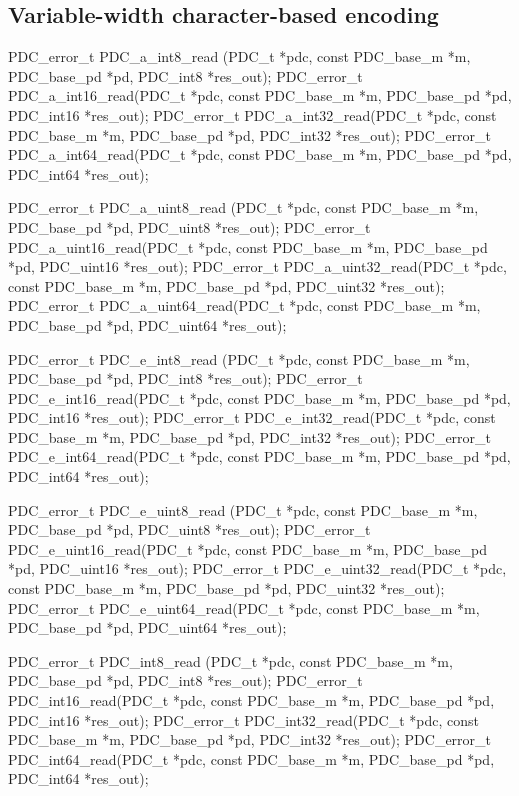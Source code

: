 \subsection{Variable-width character-based encoding}

\aedBegin{}
\aedEnd{}

\begin{tinycodeaux}{\leftmargin=0in}
\codeallowbreaks
PDC_error_t PDC_a_int8_read (PDC_t *pdc, const PDC_base_m *m,
			     PDC_base_pd *pd, PDC_int8 *res_out);
PDC_error_t PDC_a_int16_read(PDC_t *pdc, const PDC_base_m *m,
			     PDC_base_pd *pd, PDC_int16 *res_out);
PDC_error_t PDC_a_int32_read(PDC_t *pdc, const PDC_base_m *m,
			     PDC_base_pd *pd, PDC_int32 *res_out);
PDC_error_t PDC_a_int64_read(PDC_t *pdc, const PDC_base_m *m,
			     PDC_base_pd *pd, PDC_int64 *res_out);

PDC_error_t PDC_a_uint8_read (PDC_t *pdc, const PDC_base_m *m,
			      PDC_base_pd *pd, PDC_uint8 *res_out);
PDC_error_t PDC_a_uint16_read(PDC_t *pdc, const PDC_base_m *m,
			      PDC_base_pd *pd, PDC_uint16 *res_out);
PDC_error_t PDC_a_uint32_read(PDC_t *pdc, const PDC_base_m *m,
			      PDC_base_pd *pd, PDC_uint32 *res_out);
PDC_error_t PDC_a_uint64_read(PDC_t *pdc, const PDC_base_m *m,
			      PDC_base_pd *pd, PDC_uint64 *res_out);

PDC_error_t PDC_e_int8_read (PDC_t *pdc, const PDC_base_m *m,
			     PDC_base_pd *pd, PDC_int8 *res_out);
PDC_error_t PDC_e_int16_read(PDC_t *pdc, const PDC_base_m *m,
			     PDC_base_pd *pd, PDC_int16 *res_out);
PDC_error_t PDC_e_int32_read(PDC_t *pdc, const PDC_base_m *m,
			     PDC_base_pd *pd, PDC_int32 *res_out);
PDC_error_t PDC_e_int64_read(PDC_t *pdc, const PDC_base_m *m,
			     PDC_base_pd *pd, PDC_int64 *res_out);

PDC_error_t PDC_e_uint8_read (PDC_t *pdc, const PDC_base_m *m,
			      PDC_base_pd *pd, PDC_uint8 *res_out);
PDC_error_t PDC_e_uint16_read(PDC_t *pdc, const PDC_base_m *m,
			      PDC_base_pd *pd, PDC_uint16 *res_out);
PDC_error_t PDC_e_uint32_read(PDC_t *pdc, const PDC_base_m *m,
			      PDC_base_pd *pd, PDC_uint32 *res_out);
PDC_error_t PDC_e_uint64_read(PDC_t *pdc, const PDC_base_m *m,
			      PDC_base_pd *pd, PDC_uint64 *res_out);

PDC_error_t PDC_int8_read (PDC_t *pdc, const PDC_base_m *m,
			    PDC_base_pd *pd, PDC_int8 *res_out);
PDC_error_t PDC_int16_read(PDC_t *pdc, const PDC_base_m *m,
			   PDC_base_pd *pd, PDC_int16 *res_out);
PDC_error_t PDC_int32_read(PDC_t *pdc, const PDC_base_m *m,
			   PDC_base_pd *pd, PDC_int32 *res_out);
PDC_error_t PDC_int64_read(PDC_t *pdc, const PDC_base_m *m,
			   PDC_base_pd *pd, PDC_int64 *res_out);


\end{tinycodeaux}

